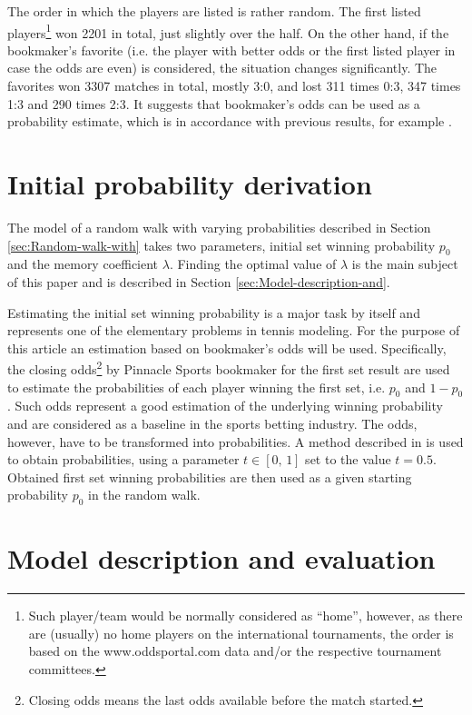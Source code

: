 \documentclass{easychair}
\begin{document}
The order in which the players are listed is rather random. The first
listed players\footnote{Such player/team would be normally considered as ``home'', however,
as there are (usually) no home players on the international tournaments,
the order is based on the www.oddsportal.com data and/or the respective
tournament committees.} won 2201 in total, just slightly over the half. On the other hand,
if the bookmaker's favorite (i.e. the player with better odds or the
first listed player in case the odds are even) is considered, the
situation changes significantly. The favorites won 3307 matches in
total, mostly 3:0, and lost 311 times 0:3, 347 times 1:3 and 290 times
2:3. It suggests that bookmaker's odds can be used as a probability
estimate, which is in accordance with previous results, for example
\cite{ja2016ddny}.

\section{Initial probability derivation\label{sec:Initial-probability-derivation}}

The model of a random walk with varying probabilities described in
Section \ref{sec:Random-walk-with} takes two parameters, initial
set winning probability $p_{0}$ and the memory coefficient $\lambda$.
Finding the optimal value of $\lambda$ is the main subject of this
paper and is described in Section \ref{sec:Model-description-and}.

Estimating the initial set winning probability is a major task by
itself and represents one of the elementary problems in tennis modeling.
For the purpose of this article an estimation based on bookmaker's
odds will be used. Specifically, the closing odds\footnote{Closing odds means the last odds available before the match started.}
by Pinnacle Sports bookmaker for the first set result are used to
estimate the probabilities of each player winning the first set, i.e.
$p_{0}$ and $1-p_{0}$. Such odds represent a good estimation of
the underlying winning probability and are considered as a baseline
in the sports betting industry. The odds, however, have to be transformed
into probabilities. A method described in \cite{ja2015ddny} is used
to obtain probabilities, using a parameter $t\in[0,\,1]$ set to the
value $t=0.5$. Obtained first set winning probabilities are then
used as a given starting probability $p_{0}$ in the random walk.

\section{Model description and evaluation\label{sec:Model-description-and}}
\end{document}
